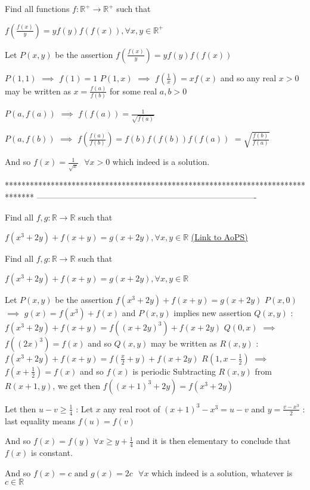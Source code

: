 \begin{solution}
	\begin{tcolorbox}Find all functions $f:\mathbb{R}^{+}\rightarrow \mathbb{R}^{+}  $ such that

$ f\left ( \frac{f(x)}{y} \right )=yf(y)f(f(x))  ,\forall x,y\in \mathbb{R}^{+}$\end{tcolorbox}
Let $P(x,y)$ be the assertion $f(\frac{f(x)}y)=yf(y)f(f(x))$

$P(1,1)$ $\implies$ $f(1)=1$
$P(1,x)$ $\implies$ $f(\frac 1x)=xf(x)$ and so any real $x>0$ may be written as $x=\frac{f(a)}{f(b)}$ for some real $a,b>0$

$P(a,f(a))$ $\implies$ $f(f(a))=\frac 1{\sqrt{f(a)}}$

$P(a,f(b))$ $\implies$ $f(\frac{f(a)}{f(b)})=f(b)f(f(b))f(f(a))$ $=\sqrt{\frac{f(b)}{f(a)}}$

And so $\boxed{f(x)=\frac 1{\sqrt x}\text{  }\forall x>0}$ which indeed is a solution.
\end{solution}
*******************************************************************************
-------------------------------------------------------------------------------

\begin{problem}
	Find all $ f,g: \mathbb{R}\rightarrow \mathbb{R} $  such that 

$f(x^{3}+2y)+f(x+y)=g(x+2y),\forall x,y\in \mathbb{R}$
	\flushright \href{https://artofproblemsolving.com/community/c6h618335}{(Link to AoPS)}
\end{problem}



\begin{solution}
	\begin{tcolorbox}Find all $ f,g: \mathbb{R}\rightarrow \mathbb{R} $  such that 

$f(x^{3}+2y)+f(x+y)=g(x+2y),\forall x,y\in \mathbb{R}$\end{tcolorbox}
Let $P(x,y)$ be the assertion $f(x^3+2y)+f(x+y)=g(x+2y)$
$P(x,0)$ $\implies$ $g(x)=f(x^3)+f(x)$ and $P(x,y)$ implies new assertion $Q(x,y)$ : $f(x^3+2y)+f(x+y)=f((x+2y)^3)+f(x+2y)$
$Q(0,x)$ $\implies$ $f((2x)^3)=f(x)$ and so $Q(x,y)$ may be written as $R(x,y)$ : $f(x^3+2y)+f(x+y)=f(\frac x2+y)+f(x+2y)$
$R(1,x-\frac 12)$ $\implies$ $f(x+\frac 12)=f(x)$ and so $f(x)$ is periodic
Subtracting $R(x,y)$ from $R(x+1,y)$, we get then $f((x+1)^3+2y)=f(x^3+2y)$

Let then $u-v\ge \frac 14$ :
Let $x$ any real root of $(x+1)^3-x^3=u-v$ and $y=\frac {v-x^3}2$ : last equality means $f(u)=f(v)$

And so $f(x)=f(y)$ $\forall x\ge y+\frac 14$ and it is then elementary to conclude that $f(x)$ is constant.

And so  ${\boxed{f(x)=c\text{  and  }g(x)=2c}\text{  }\forall x}$ which indeed is a solution, whatever is $c\in\mathbb R$
\end{solution}



